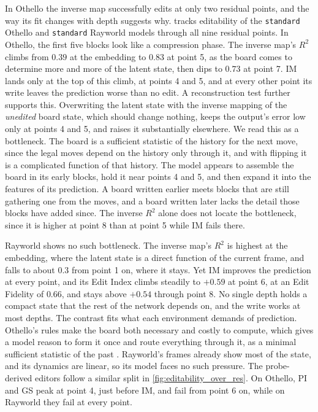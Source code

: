 \documentclass{article} %
\begin{document}
In Othello the inverse map successfully edits at only two residual points, and the way its fit changes with depth suggests why.  tracks editability of the \texttt{standard} Othello and \texttt{standard} Rayworld models through all nine residual points. In Othello, the first five blocks look like a compression phase. The inverse map's $R^2$ climbs from $0.39$ at the embedding to $0.83$ at point 5, as the board comes to determine more and more of the latent state, then dips to $0.73$ at point 7. IM lands only at the top of this climb, at points 4 and 5, and at every other point its write leaves the prediction worse than no edit. A reconstruction test further supports this. Overwriting the latent state with the inverse mapping of the \textit{unedited} board state, which should change nothing, keeps the output's error low only at points 4 and 5, and raises it substantially elsewhere. We read this as a bottleneck. The board is a sufficient statistic of the history for the next move, since the legal moves depend on the history only through it, and with flipping it is a complicated function of that history. The model appears to assemble the board in its early blocks, hold it near points 4 and 5, and then expand it into the features of its prediction. A board written earlier meets blocks that are still gathering one from the moves, and a board written later lacks the detail those blocks have added since. The inverse $R^2$ alone does not locate the bottleneck, since it is higher at point 8 than at point 5 while IM fails there.

Rayworld shows no such bottleneck. The inverse map's $R^2$ is highest at the embedding, where the latent state is a direct function of the current frame, and falls to about $0.3$ from point 1 on, where it stays. Yet IM improves the prediction at every point, and its Edit Index climbs steadily to $+0.59$ at point 6, at an Edit Fidelity of $0.66$, and stays above $+0.54$ through point 8. No single depth holds a compact state that the rest of the network depends on, and the write works at most depths. The contrast fits what each environment demands of prediction. Othello's rules make the board both necessary and costly to compute, which gives a model reason to form it once and route everything through it, as a minimal sufficient statistic of the past \citep{shalizi2001computational}. Rayworld's frames already show most of the state, and its dynamics are linear, so its model faces no such pressure. The probe-derived editors follow a similar split in \cref{fig:editability_over_res}. On Othello, PI and GS peak at point 4, just before IM, and fail from point 6 on, while on Rayworld they fail at every point.
\end{document}
